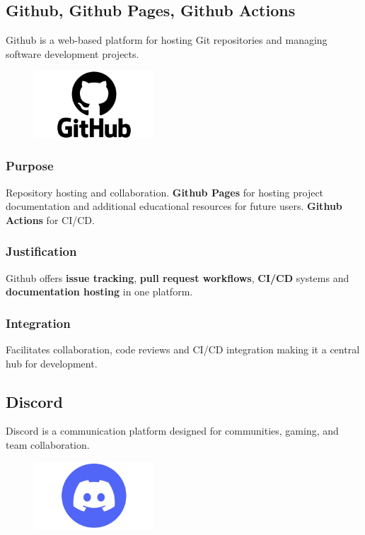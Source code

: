 \documentclass[a4paper, 11pt]{article}
\begin{document}
\subsection{Github, Github Pages, Github Actions}
Github is a web-based platform for hosting Git repositories and managing software development projects.

\begin{figure}[h]
    \centering
    \includegraphics[width=0.4\textwidth]{github.png}
\end{figure}

\subsubsection{Purpose}
Repository hosting and collaboration. \textbf{Github Pages} for hosting project documentation and additional educational resources for future users. \textbf{Github Actions} for CI/CD.

\subsubsection{Justification}
Github offers \textbf{issue tracking}, \textbf{pull request workflows}, \textbf{CI/CD} systems and \textbf{documentation hosting} in one platform.

\subsubsection{Integration}
Facilitates collaboration, code reviews and CI/CD integration making it a central hub for development.

\newpage\subsection{Discord}
Discord is a communication platform designed for communities, gaming, and team collaboration.

\begin{figure}[h]
    \centering
    \includegraphics[width=0.4\textwidth]{discord.png}
\end{figure}
\end{document}
